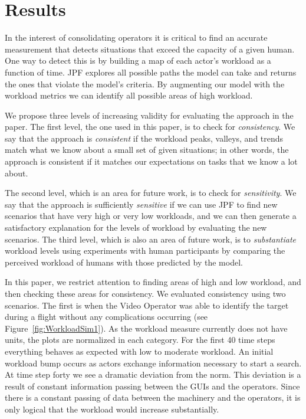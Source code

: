 \section{Results}
In the interest of consolidating operators it is critical to find an accurate measurement that detects situations that exceed the capacity of a given human. One way to detect this is by building a map of each actor's workload as a function of time. JPF explores all possible paths the model can take and returns the ones that violate the model's criteria. By augmenting our model with the workload metrics we can identify all possible areas of high workload. 

We propose three levels of increasing validity for evaluating the approach in the paper.  The first level, the one used in this paper, is to check for {\em consistency}.  We say that the approach is {\em consistent} if the workload peaks, valleys, and trends match what we know about a small set of given situations; in other words, the approach is consistent if it matches our expectations on tasks that we know a lot about.  

The second level, which is an area for future work, is to check for {\em sensitivity}.  We say that  the approach is sufficiently {\em sensitive} if we can use JPF to find new scenarios that have very high or very low workloads, and we can then generate a satisfactory explanation for the levels of workload by evaluating the new scenarios.  The third level, which is also an area of future work, is to {\em substantiate} workload levels using experiments with human participants by comparing the perceived workload of humans with those predicted by the model.

In this paper, we restrict attention to finding areas of high and low workload, and then checking these areas for consistency.  We evaluated consistency using two scenarios.  The first is when the Video Operator was able to identify the target during a flight without any complications occurring (see Figure~\ref{fig:WorkloadSim1}). As the workload measure currently does not have units, the plots are normalized in each category. For the first 40 time steps everything behaves as expected with low to moderate workload. An initial workload bump occurs as actors exchange information necessary to start a search.   At time step forty we see a dramatic deviation from the norm. This deviation is a result of constant information passing between the GUIs and the operators. Since there is a constant passing of data between the machinery and the operators, it is only logical that the workload would increase substantially.

